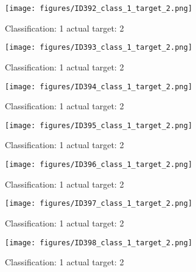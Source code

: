 \begin{figure}[h!]
\begin{center}
\texttt{[image: figures/ID392\_class\_1\_target\_2.png]}
\end{center}
\caption{ Classification: 1 actual target: 2}
\label{fig:ID392_class_1_target_2}
\end{figure}
\begin{figure}[h!]
\begin{center}
\texttt{[image: figures/ID393\_class\_1\_target\_2.png]}
\end{center}
\caption{ Classification: 1 actual target: 2}
\label{fig:ID393_class_1_target_2}
\end{figure}
\begin{figure}[h!]
\begin{center}
\texttt{[image: figures/ID394\_class\_1\_target\_2.png]}
\end{center}
\caption{ Classification: 1 actual target: 2}
\label{fig:ID394_class_1_target_2}
\end{figure}
\begin{figure}[h!]
\begin{center}
\texttt{[image: figures/ID395\_class\_1\_target\_2.png]}
\end{center}
\caption{ Classification: 1 actual target: 2}
\label{fig:ID395_class_1_target_2}
\end{figure}
\begin{figure}[h!]
\begin{center}
\texttt{[image: figures/ID396\_class\_1\_target\_2.png]}
\end{center}
\caption{ Classification: 1 actual target: 2}
\label{fig:ID396_class_1_target_2}
\end{figure}
\begin{figure}[h!]
\begin{center}
\texttt{[image: figures/ID397\_class\_1\_target\_2.png]}
\end{center}
\caption{ Classification: 1 actual target: 2}
\label{fig:ID397_class_1_target_2}
\end{figure}
\begin{figure}[h!]
\begin{center}
\texttt{[image: figures/ID398\_class\_1\_target\_2.png]}
\end{center}
\caption{ Classification: 1 actual target: 2}
\label{fig:ID398_class_1_target_2}
\end{figure}
